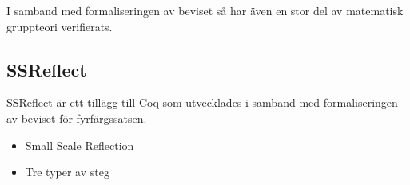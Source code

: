 I samband med formaliseringen av beviset så har även en stor del av matematisk
gruppteori verifierats.

\subsection{SSReflect}
SSReflect är ett tillägg till Coq som utvecklades i samband med formaliseringen
av beviset för fyrfärgssatsen.

\begin{itemize}
  \item Small Scale Reflection
  \item Tre typer av steg
\end{itemize}
